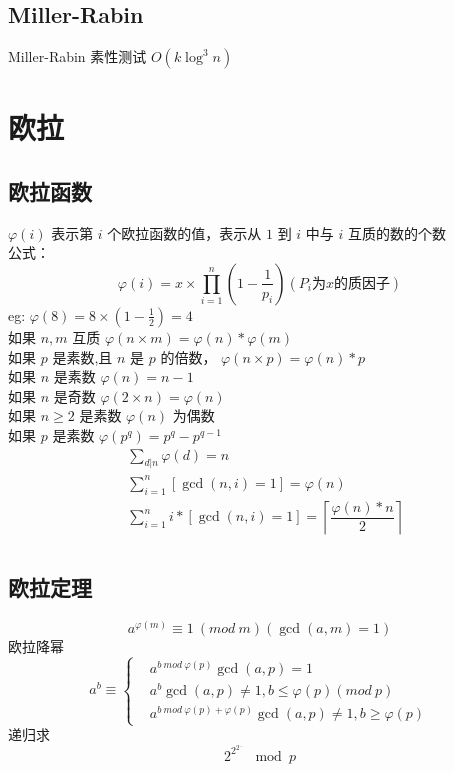 \documentclass{probook}
\begin{document}
\subsection{Miller-Rabin}
Miller-Rabin 素性测试 $O(k \log^3 n)$

\section{欧拉} 
\subsection{欧拉函数}
$\varphi (i)$ 表示第 $i$ 个欧拉函数的值，表示从 $1$ 到 $i$ 中与 $i$ 互质的数的个数\\
公式：
$$
\varphi (i) = x \times \prod_{i = 1}^{n}(1 - \dfrac{1}{p_i})(P_i 为 x 的质因子) 
$$
eg: $\varphi(8) = 8 \times(1 - \frac{1}{2}) = 4$ \\
如果 $n, m$ 互质 $\varphi(n \times m) = \varphi(n) * \varphi(m)$\\
如果 $p$ 是素数,且 $n$ 是 $p$ 的倍数， $\varphi(n \times p) = \varphi(n) * p$\\
如果 $n$ 是素数 $\varphi(n) = n - 1$\\
如果 $n$ 是奇数 $\varphi(2 \times n) = \varphi(n)$\\
如果 $n \ge 2$ 是素数 $\varphi(n)$ 为偶数\\
如果 $p$ 是素数 $\varphi(p^q) = p^q - p^{q - 1}$
$$
\begin{aligned}
&\sum_{d|n} \varphi(d) = n \\
&\sum_{i=1}^{n} [\gcd(n, i) = 1] = \varphi(n) \\
&\sum_{i=1}^{n} i * [\gcd(n, i) = 1] = \left \lceil \dfrac{\varphi(n) * n}{2}  \right \rceil \\
\end{aligned}
$$

\subsection{欧拉定理}
$$
a^{\varphi(m)} \equiv 1 \ (mod\ m ) (\gcd(a, m) = 1)
$$
欧拉降幂
$$
a^b \equiv 
\begin{cases}
&a^{b \ mod \ \varphi(p)}  \gcd(a, p) = 1 \\
&a^b  \gcd(a, p) \neq 1, b \leqslant \varphi(p) (mod \ p) \\
&a^{b \ mod \ \varphi(p) + \varphi(p)}  \gcd(a, p) \neq 1, b \geqslant \varphi(p)
\end{cases}
$$
递归求 
$$
    2^{2^{2^{\dots}}} \mod p
$$

\end{document}
